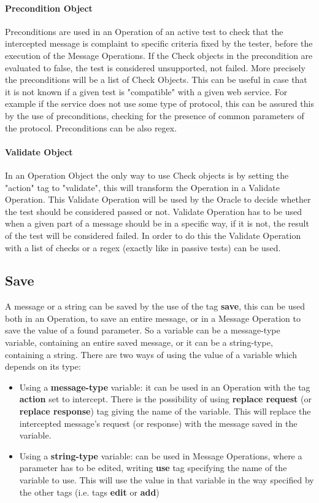 \paragraph{Precondition Object}
Preconditions are used in an Operation of an active test to check that the intercepted message is complaint to specific criteria fixed by the tester, before the execution of the Message Operations. If the Check objects in the precondition are evaluated to false, the test is considered unsupported, not failed. More precisely the preconditions will be a list of Check Objects. This can be useful in case that it is not known if a given test is "compatible" with a given web service. For example if the service does not use some type of protocol, this can be assured this by the use of preconditions, checking for the presence of common parameters of the protocol. Preconditions can be also regex.
\paragraph{Validate Object}
In an Operation Object the only way to use Check objects is by setting the "action" tag to "validate", this will transform the Operation in a Validate Operation. This Validate Operation will be used by the Oracle to decide whether the test should be considered passed or not. Validate Operation has to be used when a given part of a message should be in a specific way, if it is not, the result of the test will be considered failed.
In order to do this the Validate Operation with a list of checks or a regex (exactly like in passive tests) can be used.

\subsection{Save}
A message or a string can be saved by the use of the tag \textbf{save}, this can be used both in an Operation, to save an entire message, or in a Message Operation to save the value of a found parameter. So a variable can be a message-type variable, containing an entire saved message, or it can be a string-type, containing a string.
There are two ways of using the value of a variable which depends on its type:
\begin{itemize}
    \item Using a \textbf{message-type} variable: it can be used in an Operation with the tag \textbf{action} set to intercept. There is the possibility of using \textbf{replace request} (or \textbf{replace response}) tag giving the name of the variable. This will replace the intercepted message's request (or response) with the message saved in the variable.
    \item Using a \textbf{string-type} variable: can be used in Message Operations, where a parameter has to be edited, writing \textbf{use} tag specifying the name of the variable to use. This will use the value in that variable in the way specified by the other tags (i.e. tags \textbf{edit} or \textbf{add})
\end{itemize}

